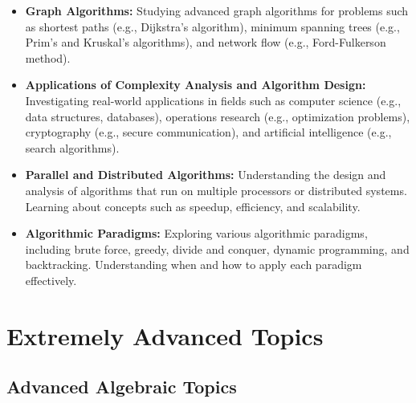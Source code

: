 \documentclass[openany]{book}
\begin{document}
\begin{itemize}
    \item \textbf{Graph Algorithms:} Studying advanced graph algorithms for problems such as shortest paths (e.g., Dijkstra's algorithm), minimum spanning trees (e.g., Prim's and Kruskal's algorithms), and network flow (e.g., Ford-Fulkerson method).
    \item \textbf{Applications of Complexity Analysis and Algorithm Design:} Investigating real-world applications in fields such as computer science (e.g., data structures, databases), operations research (e.g., optimization problems), cryptography (e.g., secure communication), and artificial intelligence (e.g., search algorithms).
    \item \textbf{Parallel and Distributed Algorithms:} Understanding the design and analysis of algorithms that run on multiple processors or distributed systems. Learning about concepts such as speedup, efficiency, and scalability.
    \item \textbf{Algorithmic Paradigms:} Exploring various algorithmic paradigms, including brute force, greedy, divide and conquer, dynamic programming, and backtracking. Understanding when and how to apply each paradigm effectively.
\end{itemize}
\chapter{Extremely Advanced Topics}
\section{Advanced Algebraic Topics}
\end{document}
